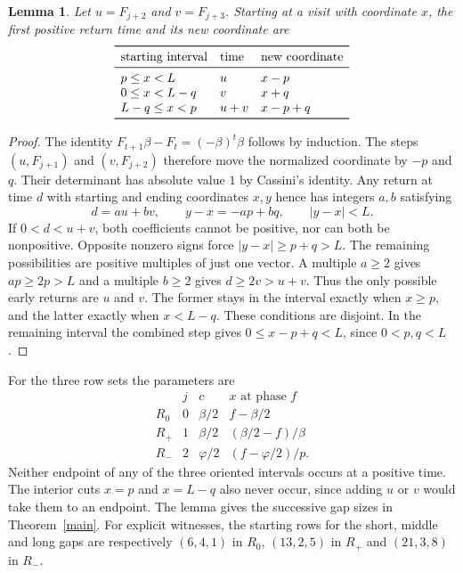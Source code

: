 \documentclass[11pt]{article}
\newtheorem{lemma}[theorem]{Lemma}
\newcommand{\ph}{\varphi}
\begin{document}
\begin{lemma}\label{induced}
Let $u=F_{j+2}$ and $v=F_{j+3}$. Starting at a visit with coordinate $x$,
the first positive return time and its new coordinate are
\[
\begin{array}{lll}
\toprule
\text{starting interval}&\text{time}&\text{new coordinate}\\
\midrule
p\le x<L        &u&x-p\\
0\le x<L-q      &v&x+q\\
L-q\le x<p      &u+v&x-p+q\\
\bottomrule
\end{array}
\]
\end{lemma}
\begin{proof}
The identity $F_{t+1}\beta-F_t=(-\beta)^t\beta$ follows by induction.
The steps $(u,F_{j+1})$ and $(v,F_{j+2})$ therefore move the normalized
coordinate by $-p$ and $q$. Their determinant has absolute value $1$ by
Cassini's identity. Any return at time $d$ with starting and ending
coordinates $x,y$ hence has integers $a,b$ satisfying
\[
 d=au+bv,\qquad y-x=-ap+bq,\qquad |y-x|<L.
\]
If $0<d<u+v$, both coefficients cannot be positive, nor can both be
nonpositive. Opposite nonzero signs force $|y-x|\ge p+q>L$.
The remaining possibilities are positive multiples of just one vector.
A multiple $a\ge2$ gives $ap\ge2p>L$ and a multiple $b\ge2$ gives
$d\ge2v>u+v$. Thus the only possible early returns are $u$ and $v$.
The former stays in the interval exactly when $x\ge p$, and the latter
exactly when $x<L-q$. These conditions are disjoint. In the remaining
interval the combined step gives $0\le x-p+q<L$, since $0<p,q<L$.
\end{proof}

For the three row sets the parameters are
\[
\begin{array}{c|ccc}
 &j&c&x\text{ at phase }f\\ \hline
R_0&0&\beta/2&f-\beta/2\\
R_+&1&\beta/2&(\beta/2-f)/\beta\\
R_-&2&\ph/2&(f-\ph/2)/p.
\end{array}
\]
Neither endpoint of any of the three oriented intervals occurs at a positive
time. The interior cuts $x=p$ and $x=L-q$ also never occur, since adding
$u$ or $v$ would take them to an endpoint. The lemma gives the successive
gap sizes in Theorem~\ref{main}. For explicit witnesses, the starting rows
for the short, middle and long gaps are respectively $(6,4,1)$ in $R_0$,
$(13,2,5)$ in $R_+$ and $(21,3,8)$ in $R_-$.
\end{document}
